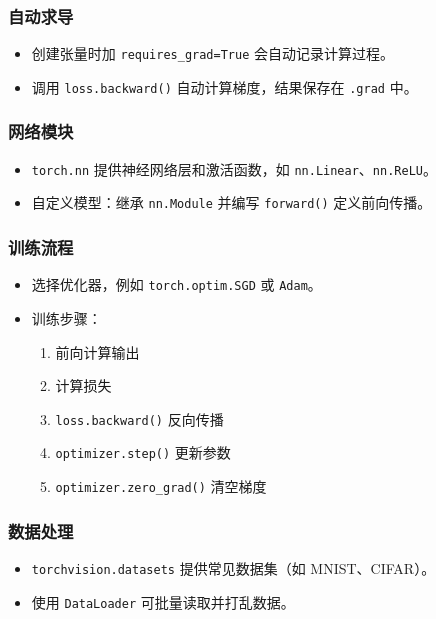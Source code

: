 \documentclass[a4paper,12pt]{ctexart}
\begin{document}
\subsubsection{自动求导}
\begin{itemize}
  \item 创建张量时加 \texttt{requires\_grad=True} 会自动记录计算过程。
  \item 调用 \texttt{loss.backward()} 自动计算梯度，结果保存在 \texttt{.grad} 中。
\end{itemize}

\subsubsection{网络模块}
\begin{itemize}
  \item \texttt{torch.nn} 提供神经网络层和激活函数，如 \texttt{nn.Linear}、\texttt{nn.ReLU}。
  \item 自定义模型：继承 \texttt{nn.Module} 并编写 \texttt{forward()} 定义前向传播。
\end{itemize}

\subsubsection{训练流程}
\begin{itemize}
  \item 选择优化器，例如 \texttt{torch.optim.SGD} 或 \texttt{Adam}。
  \item 训练步骤：
  \begin{enumerate}
    \item 前向计算输出
    \item 计算损失
    \item \texttt{loss.backward()} 反向传播
    \item \texttt{optimizer.step()} 更新参数
    \item \texttt{optimizer.zero\_grad()} 清空梯度
  \end{enumerate}
\end{itemize}

\subsubsection{数据处理}
\begin{itemize}
  \item \texttt{torchvision.datasets} 提供常见数据集（如 MNIST、CIFAR）。
  \item 使用 \texttt{DataLoader} 可批量读取并打乱数据。
\end{itemize}
\end{document}
